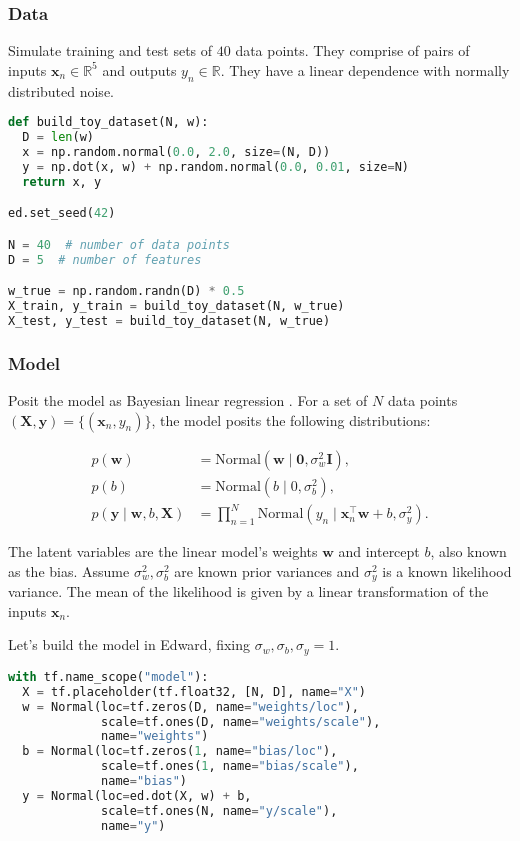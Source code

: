 \subsubsection{Data}

Simulate training and test sets of $40$ data points. They comprise of
pairs of inputs $\mathbf{x}_n\in\mathbb{R}^{5}$ and outputs
$y_n\in\mathbb{R}$. They have a linear dependence with normally
distributed noise.

\begin{lstlisting}[language=Python]
def build_toy_dataset(N, w):
  D = len(w)
  x = np.random.normal(0.0, 2.0, size=(N, D))
  y = np.dot(x, w) + np.random.normal(0.0, 0.01, size=N)
  return x, y

ed.set_seed(42)

N = 40  # number of data points
D = 5  # number of features

w_true = np.random.randn(D) * 0.5
X_train, y_train = build_toy_dataset(N, w_true)
X_test, y_test = build_toy_dataset(N, w_true)
\end{lstlisting}

\subsubsection{Model}

Posit the model as Bayesian linear regression \citep{murphy2012machine}.
For a set of $N$ data points $(\mathbf{X},\mathbf{y})=\{(\mathbf{x}_n, y_n)\}$,
the model posits the following distributions:

\begin{align*}
  p(\mathbf{w})
  &=
  \text{Normal}(\mathbf{w} \mid \mathbf{0}, \sigma_w^2\mathbf{I}),
  \\[1.5ex]
  p(b)
  &=
  \text{Normal}(b \mid 0, \sigma_b^2),
  \\
  p(\mathbf{y} \mid \mathbf{w}, b, \mathbf{X})
  &=
  \prod_{n=1}^N
  \text{Normal}(y_n \mid \mathbf{x}_n^\top\mathbf{w} + b, \sigma_y^2).
\end{align*}

The latent variables are the linear model's weights $\mathbf{w}$ and
intercept $b$, also known as the bias.
Assume $\sigma_w^2,\sigma_b^2$ are known prior variances and $\sigma_y^2$ is a
known likelihood variance. The mean of the likelihood is given by a
linear transformation of the inputs $\mathbf{x}_n$.

Let's build the model in Edward, fixing $\sigma_w,\sigma_b,\sigma_y=1$.

\begin{lstlisting}[language=Python]
with tf.name_scope("model"):
  X = tf.placeholder(tf.float32, [N, D], name="X")
  w = Normal(loc=tf.zeros(D, name="weights/loc"),
             scale=tf.ones(D, name="weights/scale"),
             name="weights")
  b = Normal(loc=tf.zeros(1, name="bias/loc"),
             scale=tf.ones(1, name="bias/scale"),
             name="bias")
  y = Normal(loc=ed.dot(X, w) + b,
             scale=tf.ones(N, name="y/scale"),
             name="y")
\end{lstlisting}

